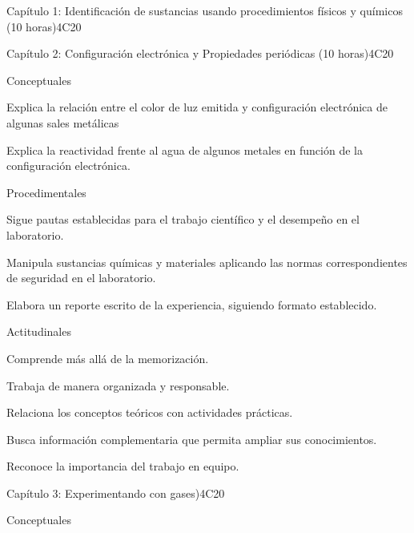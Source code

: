 \begin{syllabus}
\begin{unit}{Capítulo 1: Identificación de sustancias usando procedimientos físicos y químicos (10 horas)}{}{}{4}{C20}
   \begin{learningoutcomes}
      \item 
   \end{learningoutcomes}
\end{unit}

\begin{unit}{Capítulo 2: Configuración electrónica y Propiedades periódicas (10 horas)}{}{}{4}{C20}

Conceptuales

\begin{topics}
      \item Explica la relación entre el color de luz emitida y configuración electrónica de algunas sales metálicas
      \item Explica la reactividad frente al agua de algunos metales en función de la configuración electrónica.
   \end{topics}
   
   Procedimentales

\begin{topics}
      \item Sigue pautas establecidas para el trabajo científico y el desempeño en el laboratorio.
      \item Manipula sustancias químicas y materiales aplicando las normas correspondientes de seguridad en el laboratorio.
      \item Elabora un reporte escrito de la experiencia, siguiendo formato establecido.
   \end{topics}
   
   Actitudinales

\begin{topics}
      \item Comprende más allá de la memorización.
      \item Trabaja de manera organizada y responsable.
      \item Relaciona los conceptos teóricos con actividades prácticas.
      \item Busca información complementaria que permita ampliar sus conocimientos.
     \item Reconoce la importancia del trabajo en equipo.
   \end{topics}

\end{unit}

\begin{unit}{Capítulo 3: Experimentando con gases)}{}{}{4}{C20}

Conceptuales


\end{unit}
\end{syllabus}
